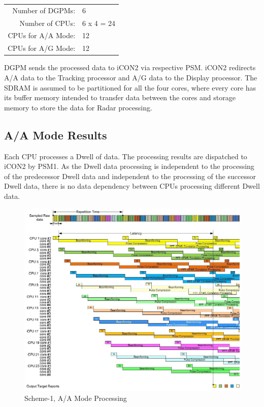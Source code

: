 \begin{tabular}{rl}
	Number of DGPMs: & 6 \\
	Number of CPUs: & 6 x 4 = 24 \\
	CPUs for A/A Mode: & 12 \\
	CPUs for A/G Mode: & 12 \\
\end{tabular}

\noindent
DGPM sends the processed data to iCON2 via respective PSM. iCON2 redirects A/A data to the Tracking processor and A/G data to the Display processor. The SDRAM is assumed to be partitioned for all the four cores, where every core has its buffer memory intended to transfer data between the cores and storage memory to store the data for Radar processing.

\subsection{A/A Mode Results}
\label{ss:scheme1:aa}
Each CPU processes a Dwell of data. The processing results are dispatched to iCON2 by PSM1. As the Dwell data processing is independent to the processing of the predecessor Dwell data and independent to the processing of the successor Dwell data, there  is no data dependency between CPUs processing different Dwell data.

\begin{figure}[h!]
	\centering
	\includegraphics[width=140mm]{figures/aa_scheme1}
	\caption{Scheme-1, A/A Mode Processing}
	\label{fig:existing_analysis:aa_scheme1}
\end{figure}

